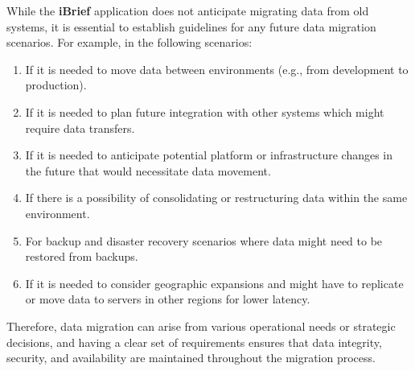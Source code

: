While the \textbf{iBrief} application does not anticipate migrating data from old systems, it is essential to establish guidelines for any future data migration scenarios. For example, in the following scenarios:

\begin{enumerate}
    \item If it is needed to move data between environments (e.g., from development to production).
    \item If it is needed to plan future integration with other systems which might require data transfers.
    \item If it is needed to anticipate potential platform or infrastructure changes in the future that would necessitate data movement.
    \item If there is a possibility of consolidating or restructuring data within the same environment.
    \item For backup and disaster recovery scenarios where data might need to be restored from backups.
    \item If it is needed to consider geographic expansions and might have to replicate or move data to servers in other regions for lower latency.
\end{enumerate}

Therefore, data migration can arise from various operational needs or strategic decisions, and having a clear set of requirements ensures that data integrity, security, and availability are maintained throughout the migration process.

